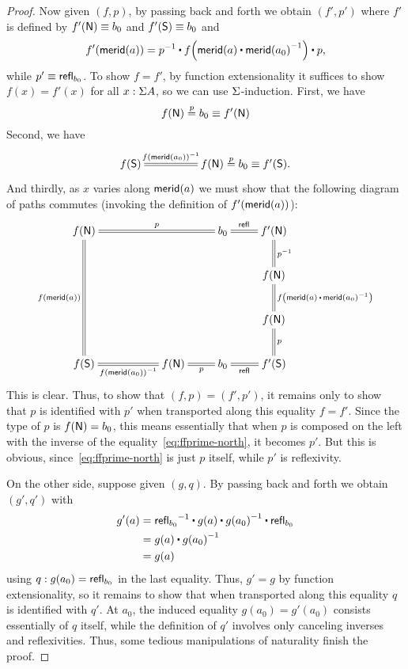 \begin{proof}
  Now given $(f,p)$, by passing back and forth we obtain $(f',p')$ where $f'$ is defined by $f'(\mathsf{N})\equiv b_0$ and $f'(\mathsf{S})\equiv b_0$ and
  \[ \ap {f'} {\merid(a)} = \opp p \ct \ap f{\merid(a) \ct \opp{\merid(a_0)}} \ct p, \]
  while $p' \equiv \mathsf{refl}_{b_0}$.
  To show $f=f'$, by function extensionality it suffices to show $f(x)=f'(x)$ for all $x:\Sigma A$, so we can use $\Sigma$-induction.
  First, we have
  \begin{equation}
    f(\north) \overset{p}{=} b_0 \jdeq f'(\north)\label{eq:ffprime-north}
  \end{equation}
  Second, we have
  \[\xymatrix@C=4pc{ f(\south) \ar@{=}[r]^-{\opp{\ap f {\merid(a_0)}}} & f(\north) \overset{\smash p}{=} b_0 \jdeq f'(\south).}\]
  And thirdly, as $x$ varies along $\mathsf{merid}(a)$ we must show that the following diagram of paths commutes (invoking the definition of ${f'}\mathopen{}\left({\mathsf{merid}(a)}\right)\mathclose{}$):
  \[ \xymatrix{
    f(\north) \ar@{=}[rrr]^-{p} \ar@{=}[ddd]_{f(\merid(a))} &&&
    b_0 \ar@{=}[r]^-{\refl{}} &
    f'(\north) \ar@{=}[d]^{\opp p}\\
    &&&& f(\north) \ar@{=}[d]^{\ap f{\merid(a) \ct \opp{\merid(a_0)}}}\\
    &&&& f(\north) \ar@{=}[d]^p\\
    f(\south) \ar@{=}[rr]_-{\opp{\ap f {\merid(a_0)}}} &&
    f(\north) \ar@{=}[r]_-p &
    b_0 \ar@{=}[r]_-{\refl{}} &
    f'(\south) }
  \]
  This is clear.
  Thus, to show that $(f,p)=(f',p')$, it remains only to show that $p$ is identified with $p'$ when transported along this equality $f=f'$.
  Since the type of $p$ is $f(\mathsf{N})=b_0$, this means essentially that when $p$ is composed on the left with the inverse of the equality~\eqref{eq:ffprime-north}, it becomes $p'$.
  But this is obvious, since~\eqref{eq:ffprime-north} is just $p$ itself, while $p'$ is reflexivity.

  On the other side, suppose given $(g,q)$.
  By passing back and forth we obtain $(g',q')$ with
  \begin{align*}
    g'(a) &= \opp{\refl{b_0}} \ct g(a) \ct \opp{g(a_0)} \ct \refl{b_0}\\
    &= g(a) \ct \opp{g(a_0)}\\
    &= g(a)
  \end{align*}
  using $q:g(a_0) = \mathsf{refl}_{b_0}$ in the last equality.
  Thus, $g'=g$ by function extensionality, so it remains to show that when transported along this equality $q$ is identified with $q'$.
  At $a_0$, the induced equality $g(a_0)=g'(a_0)$ consists essentially of $q$ itself, while the definition of $q'$ involves only canceling inverses and reflexivities.
  Thus, some tedious manipulations of naturality finish the proof.
\end{proof}

